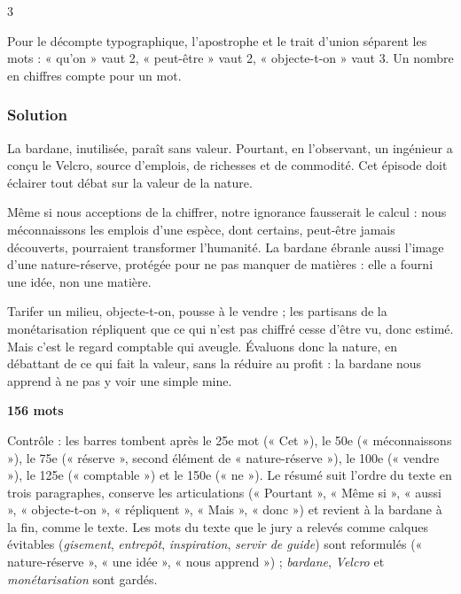 \documentclass[11pt,a4paper]{article}
\begin{document}
\begin{indication}{3}

Pour le décompte typographique, l'apostrophe et le trait d'union séparent les mots : « qu'on » vaut 2, « peut-être » vaut 2, « objecte-t-on » vaut 3. Un nombre en chiffres compte pour un mot.

\end{indication}

\hypertarget{solution-1}{%
\subsubsection{Solution}\label{solution-1}}

La bardane, inutilisée, paraît sans valeur. Pourtant, en l'observant, un ingénieur a conçu le Velcro, source d'emplois, de richesses et de commodité. Cet \textbar{} épisode doit éclairer tout débat sur la valeur de la nature.

Même si nous acceptions de la chiffrer, notre ignorance fausserait le calcul : nous méconnaissons \textbar{} les emplois d'une espèce, dont certains, peut-être jamais découverts, pourraient transformer l'humanité. La bardane ébranle aussi l'image d'une nature-réserve, \textbar{} protégée pour ne pas manquer de matières : elle a fourni une idée, non une matière.

Tarifer un milieu, objecte-t-on, pousse à le vendre ; \textbar{} les partisans de la monétarisation répliquent que ce qui n'est pas chiffré cesse d'être vu, donc estimé. Mais c'est le regard comptable \textbar{} qui aveugle. Évaluons donc la nature, en débattant de ce qui fait la valeur, sans la réduire au profit : la bardane nous apprend à ne \textbar{} pas y voir une simple mine.

\textbf{156 mots}

Contrôle : les barres tombent après le 25e mot (« Cet »), le 50e (« méconnaissons »), le 75e (« réserve », second élément de « nature-réserve »), le 100e (« vendre »), le 125e (« comptable ») et le 150e (« ne »). Le résumé suit l'ordre du texte en trois paragraphes, conserve les articulations (« Pourtant », « Même si », « aussi », « objecte-t-on », « répliquent », « Mais », « donc ») et revient à la bardane à la fin, comme le texte. Les mots du texte que le jury a relevés comme calques évitables (\emph{gisement}, \emph{entrepôt}, \emph{inspiration}, \emph{servir de guide}) sont reformulés (« nature-réserve », « une idée », « nous apprend ») ; \emph{bardane}, \emph{Velcro} et \emph{monétarisation} sont gardés.
\end{document}
